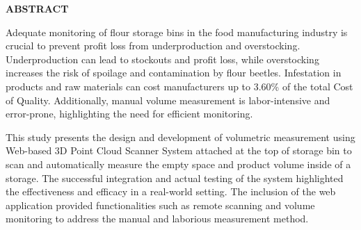 \begin{center}
	\noindent \textbf{ABSTRACT}
\end{center}


Adequate monitoring of flour storage bins in the food manufacturing industry is crucial to prevent profit loss from underproduction and overstocking. Underproduction can lead to stockouts and profit loss, while overstocking increases the risk of spoilage and contamination by flour beetles. Infestation in products and raw materials can cost manufacturers up to 3.60\% of the total Cost of Quality. Additionally, manual volume measurement is labor-intensive and error-prone, highlighting the need for efficient monitoring.

This study presents the design and development of volumetric measurement using Web-based 3D Point Cloud Scanner System attached at the top of storage bin to scan and automatically measure the empty space and product volume inside of a storage. The successful integration and actual testing of the system highlighted the effectiveness and efficacy in a real-world setting. The inclusion of the web application provided functionalities such as remote scanning and volume monitoring to address the manual and laborious measurement method.

